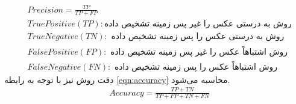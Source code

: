\begin{enumerate}
\begin{equation}
		\label{eqn:precision_and_description}
		\begin{split}
		   	&Precision = \frac{TP}{TP + FP}\\
			&TruePositive(TP) :\textit{روش به درستی عکس را غیر پس زمینه تشخیص داده}\\
			&TrueNegative(TN) :\textit{ روش به درستی عکس را پس زمینه تشخیص داده}\\
			&FalsePositive(FP) :\textit{ روش اشتباهاً عکس را غیر پس زمینه تشخیص داده}\\
			&FalseNegative(FN) :\textit{ روش اشتباهاً عکس را پس زمینه تشخیص داده}
		\end{split}
	\end{equation}
    دقت روش نیز با توجه به رابطه \ref{eqn:accuracy} محاسبه می‌شود.
   	\begin{equation}
    	\label{eqn:accuracy}
    	\begin{split}
    		&Accuracy = \frac{TP + TN}{TP + FP + TN + FN}\\
    	\end{split}
    \end{equation}
    

\end{enumerate}
